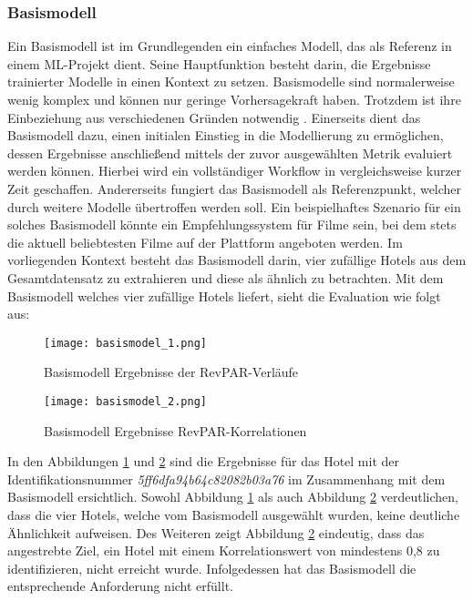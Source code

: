 \subsubsection{Basismodell}
\label{subsubsec:Basismodel}
Ein Basismodell ist im Grundlegenden ein einfaches Modell, das als Referenz in einem ML-Projekt dient. Seine Hauptfunktion besteht darin, die Ergebnisse trainierter Modelle in einen Kontext zu setzen. Basismodelle sind normalerweise wenig komplex und können nur geringe Vorhersagekraft haben. Trotzdem ist ihre Einbeziehung aus verschiedenen Gründen notwendig \cite{Nair.04.04.2022}.
\newline
\newline
Einerseits dient das Basismodell dazu, einen initialen Einstieg in die Modellierung zu ermöglichen, dessen Ergebnisse anschließend mittels der zuvor ausgewählten Metrik evaluiert werden können. Hierbei wird ein vollständiger Workflow in vergleichsweise kurzer Zeit geschaffen. Andererseits fungiert das Basismodell als Referenzpunkt, welcher durch weitere Modelle übertroffen werden soll. Ein beispielhaftes Szenario für ein solches Basismodell könnte ein Empfehlungssystem für Filme sein, bei dem stets die aktuell beliebtesten Filme auf der Plattform angeboten werden.
\newline
\newline
Im vorliegenden Kontext besteht das Basismodell darin, vier zufällige Hotels aus dem Gesamtdatensatz zu extrahieren und diese als ähnlich zu betrachten. Mit dem Basismodell welches vier zufällige Hotels liefert, sieht die Evaluation wie folgt aus:

\begin{figure}[h]
    \centering
    \texttt{[image: basismodel\_1.png]}
    \caption[Basismodell Ergebnisse der RevPAR-Verläufe]{Basismodell Ergebnisse der RevPAR-Verläufe}
    \label{img:basismodell_1}
\end{figure}

\begin{figure}[h]
    \centering
    \texttt{[image: basismodel\_2.png]}
    \caption[Basismodell Ergebnisse der RevPAR-Korrelationen]{Basismodell Ergebnisse RevPAR-Korrelationen}
    \label{img:basismodell_2}
\end{figure}

In den Abbildungen \ref{img:basismodell_1} und \ref{img:basismodell_2} sind die Ergebnisse für das Hotel mit der Identifikationsnummer \emph{5ff6dfa94b64c82082b03a76} im Zusammenhang mit dem Basismodell ersichtlich. Sowohl Abbildung \ref{img:basismodell_1} als auch Abbildung \ref{img:basismodell_2} verdeutlichen, dass die vier Hotels, welche vom Basismodell ausgewählt wurden, keine deutliche Ähnlichkeit aufweisen. Des Weiteren zeigt Abbildung \ref{img:basismodell_2} eindeutig, dass das angestrebte Ziel, ein Hotel mit einem Korrelationswert von mindestens 0,8 zu identifizieren, nicht erreicht wurde. Infolgedessen hat das Basismodell die entsprechende Anforderung nicht erfüllt.

